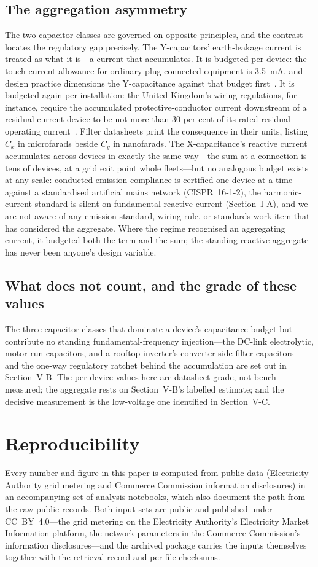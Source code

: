 \documentclass[journal]{IEEEtran}
\begin{document}
\subsection{The aggregation asymmetry}
The two capacitor classes are governed on opposite principles, and the
contrast locates the regulatory gap precisely. The Y-capacitors'
earth-leakage current is treated as what it is---a current that accumulates.
It is budgeted per device: the touch-current allowance for ordinary
plug-connected equipment is 3.5~mA, and design practice dimensions the
Y-capacitance against that budget first~\cite{wurth_anp015}. It is budgeted
again per installation: the United Kingdom's wiring regulations, for
instance, require the accumulated protective-conductor current downstream of
a residual-current device to be not more than 30 per cent of its rated
residual operating current~\cite{bs7671}. Filter datasheets print the
consequence in their units, listing $C_x$ in microfarads beside $C_y$ in
nanofarads. The X-capacitance's reactive current accumulates across devices
in exactly the same way---the sum at a connection is tens of devices, at a
grid exit point whole fleets---but no analogous budget exists at any scale:
conducted-emission compliance is certified one device at a time against a
standardised artificial mains network (CISPR~16-1-2), the harmonic-current
standard is silent on fundamental reactive current (Section~I-A), and we are
not aware of any emission standard, wiring rule, or standards work item that
has considered the aggregate. Where the regime recognised an aggregating
current, it budgeted both the term and the sum; the standing reactive aggregate
has never been anyone's design variable.

\subsection{What does not count, and the grade of these values}
The three capacitor classes that dominate a device's capacitance budget but
contribute no standing fundamental-frequency injection---the DC-link
electrolytic, motor-run capacitors, and a rooftop inverter's converter-side
filter capacitors---and the one-way regulatory ratchet behind the accumulation
are set out in Section~V-B. The per-device values here are datasheet-grade,
not bench-measured; the aggregate rests on Section~V-B's labelled estimate;
and the decisive measurement is the low-voltage one identified in
Section~V-C.

\section*{Reproducibility}
Every number and figure in this paper is computed from public data (Electricity
Authority grid metering and Commerce Commission information disclosures) in an
accompanying set of analysis notebooks, which also document the path from the raw
public records. Both input sets are public and published under CC~BY~4.0---the grid
metering on the Electricity Authority's Electricity Market Information platform,
the network parameters in the Commerce Commission's information disclosures---and
the archived package carries the inputs themselves together with the retrieval
record and per-file checksums.
\end{document}
